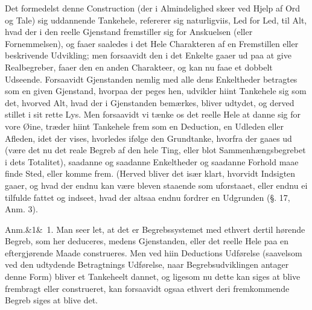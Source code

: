 \documentclass[12pt]{book}
\def\sperr#1{#1}%
\def\textit#1{#1}%
\def\emph#1{#1}%
\newcommand{\sperr}[1]{\textls[180]{#1}}
\newcommand{\anm}[1]{%
  \par\vspace{0.5\baselineskip}%
  \noindent\hspace{\parindent}\sperr{Anm.}\ifx&#1&\else~\textit{#1}.\fi
  \enspace\ignorespaces
}
\newcommand{\opage}[1]{\marginnote{\footnotesize\textit{[#1]}}}
\begin{document}
Det formedelst denne Construction (der i Almindelighed skeer ved Hjelp af Ord og
Tale) sig uddannende Tankehele, refererer sig naturligviis, Led for Led, til Alt,
hvad der i den reelle Gjenstand fremstiller sig for Anskuelsen (eller
Fornemmelsen), og faaer saaledes i det Hele Charakteren af en Fremstillen eller
beskrivende Udvikling; men forsaavidt den i det Enkelte gaaer ud paa at give
Realbegreber, faaer den en anden Charakteer, og kan nu faae et dobbelt Udseende.
Forsaavidt Gjenstanden nemlig med alle dens Enkeltheder betragtes som en given
Gjenstand, hvorpaa der peges hen, udvikler hiint Tankehele sig som det, hvorved
Alt, hvad der i Gjenstanden bemærkes, bliver udtydet, og derved stillet i sit
rette Lys. Men forsaavidt vi tænke os det reelle Hele at danne sig for vore Øine,
træder hiint Tankehele frem som en \emph{Deduction}, en Udleden eller Afleden,
idet der vises, hvorledes ifølge den Grundtanke, hvorfra
\opage{90} %
der gaaes ud (være det nu det reale Begreb af den hele Ting, eller blot
Sammenhængsbegrebet i dets Totalitet), saadanne og saadanne Enkeltheder og
saadanne Forhold maae finde Sted, eller komme frem. (Herved bliver det især
klart, hvorvidt Indsigten gaaer, og hvad der endnu kan være bleven staaende som
uforstaaet, eller endnu ei tilfulde fattet og indseet, hvad der altsaa endnu
fordrer en Udgrunden (§. 17, Anm. 3).

\anm{1} Man seer let, at det er Begrebssystemet med ethvert dertil hørende
Begreb, som her deduceres, medens Gjenstanden, eller det reelle Hele paa en
eftergjørende Maade construeres. Men ved hiin Deductions Udførelse (saavelsom
ved den udtydende Betragtnings Udførelse, naar Begrebsudviklingen antager denne
Form) bliver et Tankeheelt dannet, og ligesom nu dette kan siges at blive
frembragt eller construeret, kan forsaavidt ogsaa ethvert deri fremkommende
Begreb siges at blive det.
\end{document}
